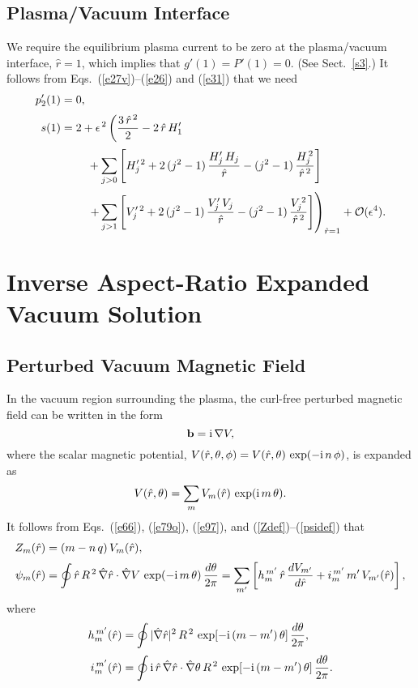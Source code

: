 \documentclass[12pt,prb,aps]{revtex4-1}
\begin{document}
\subsection{Plasma/Vacuum Interface}
We require the equilibrium plasma current to be zero at the plasma/vacuum interface, $\hat{r}=1$, which
implies that $g'(1)=P'(1)= 0$. (See Sect.~\ref{s3}.) It follows from Eqs.~(\ref{e27v})--(\ref{e26}) and (\ref{e31}) that we need\,\cite{am1}
\begin{align}
p_2'(1) &= 0,\label{e222}\\[0.5ex]
s(1) &= 2+ \epsilon^{\,2}\left(\frac{3\,\hat{r}^{\,2}}{2}-2\,\hat{r}\,H_1'\right.\nonumber\\[0.5ex]
&\phantom{===}
+\sum_{j>0}\left[H_j'^{\,2}+2\,(j^2-1)\,\frac{H_j'\,H_j}{\hat{r}}-(j^2-1)\,\frac{H_j^{\,2}}{\hat{r}^{\,2}}\right]\nonumber\\[0.5ex]
&\phantom{===}\left.+\sum_{j>1}\left[V_j'^{\,2}+2\,(j^2-1)\,\frac{V_j'\,V_j}{\hat{r}}-(j^2-1)\,\frac{V_j^{\,2}}{\hat{r}^{\,2}}\right]\right)_{\hat{r}=1}
+{\cal O}(\epsilon^4).\label{e223}
\end{align}

\section{Inverse Aspect-Ratio Expanded Vacuum Solution}\label{vacx}
\subsection{Perturbed Vacuum Magnetic Field}\label{pertb}
In the vacuum region surrounding the plasma, the curl-free perturbed magnetic field can be written in the form\,\cite{am1}
\begin{equation}
{\bf b} = {\rm i}\,\nabla V,
\end{equation}
where the scalar magnetic potential, $V(\hat{r},\theta,\phi)= V(\hat{r},\theta)\,\exp(-{\rm i}\,n\,\phi)$,  is expanded as 
\begin{equation}\label{e225}
V(\hat{r},\theta) = \sum_{m}V_m(\hat{r})\,\exp({\rm i}\,m\,\theta).
\end{equation}
It follows from Eqs.~(\ref{e66}), (\ref{e79o}), (\ref{e97}), and (\ref{Zdef})--(\ref{psidef}) that
\begin{align}
Z_m(\hat{r})&= (m-n\,q)\,V_m(\hat{r}),\label{evdef}\\[0.5ex]
\psi_m(\hat{r}) &= \oint \hat{r}\,R^{\,2}\,\hat{\nabla}\hat{r}\cdot\hat{\nabla} V\,\exp(-{\rm i}\,m\,\theta)\,\frac{d\theta}{2\pi}= \sum_{m'}\left[h_m^{\,m'}\,\hat{r}\,\frac{dV_{m'}}{d\hat{r}}+ i_{m}^{\,m'}\,m'\,V_{m'}(\hat{r})\right],
\end{align}
where
\begin{align}
h_m^{\,m'}(\hat{r})&= \oint |\hat{\nabla}\hat{r}|^2\,R^{\,2}\,\exp[-{\rm i}\,(m-m')\,\theta]\,\frac{d\theta}{2\pi},\\[0.5ex]
i_m^{\,m'}(\hat{r})&= \oint {\rm i}\,\hat{r}\,\hat{\nabla} \hat{r}\cdot\hat{\nabla}\theta\,R^{\,2} \,\exp[-{\rm i}\,(m-m')\,\theta]\,\frac{d\theta}{2\pi}.\label{e229}
\end{align}
\end{document}
